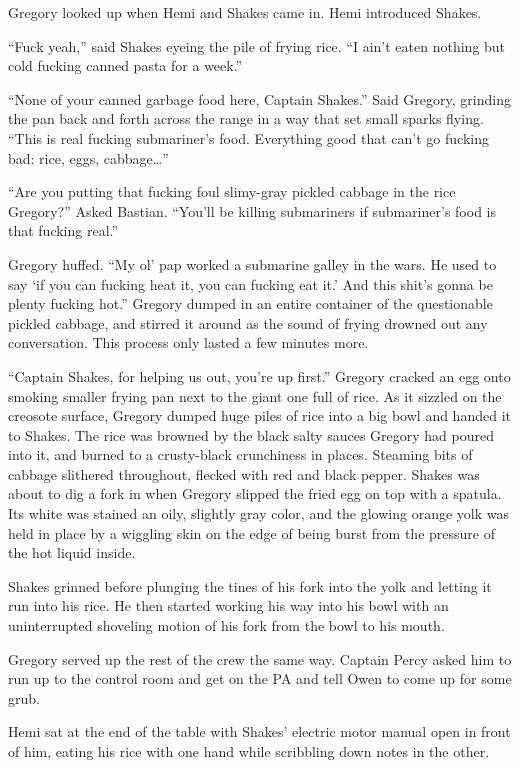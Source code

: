 \documentclass[
]{scrbook}
\begin{document}
Gregory looked up when Hemi and Shakes came in. Hemi introduced Shakes.

``Fuck yeah,'' said Shakes eyeing the pile of frying rice. ``I ain't
eaten nothing but cold fucking canned pasta for a week.''

``None of your canned garbage food here, Captain Shakes.'' Said Gregory,
grinding the pan back and forth across the range in a way that set small
sparks flying. ``This is real fucking submariner's food. Everything good
that can't go fucking bad: rice, eggs, cabbage\ldots{}''

``Are you putting that fucking foul slimy-gray pickled cabbage in the
rice Gregory?'' Asked Bastian. ``You'll be killing submariners if
submariner's food is that fucking real.''

Gregory huffed. ``My ol' pap worked a submarine galley in the wars. He
used to say `if you can fucking heat it, you can fucking eat it.' And
this shit's gonna be plenty fucking hot.'' Gregory dumped in an entire
container of the questionable pickled cabbage, and stirred it around as
the sound of frying drowned out any conversation. This process only
lasted a few minutes more.

``Captain Shakes, for helping us out, you're up first.'' Gregory cracked
an egg onto smoking smaller frying pan next to the giant one full of
rice. As it sizzled on the creosote surface, Gregory dumped huge piles
of rice into a big bowl and handed it to Shakes. The rice was browned by
the black salty sauces Gregory had poured into it, and burned to a
crusty-black crunchiness in places. Steaming bits of cabbage slithered
throughout, flecked with red and black pepper. Shakes was about to dig a
fork in when Gregory slipped the fried egg on top with a spatula. Its
white was stained an oily, slightly gray color, and the glowing orange
yolk was held in place by a wiggling skin on the edge of being burst
from the pressure of the hot liquid inside.

Shakes grinned before plunging the tines of his fork into the yolk and
letting it run into his rice. He then started working his way into his
bowl with an uninterrupted shoveling motion of his fork from the bowl to
his mouth.

Gregory served up the rest of the crew the same way. Captain Percy asked
him to run up to the control room and get on the PA and tell Owen to
come up for some grub.

Hemi sat at the end of the table with Shakes' electric motor manual open
in front of him, eating his rice with one hand while scribbling down
notes in the other.
\end{document}
